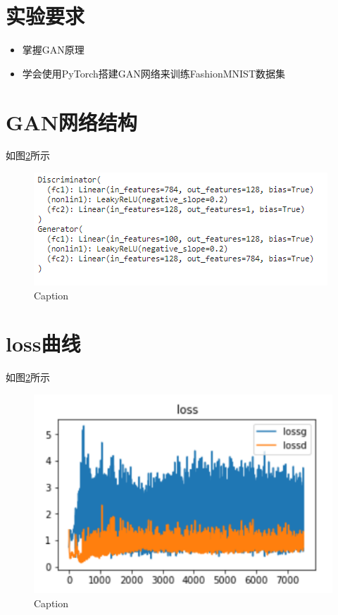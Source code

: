 \documentclass[UTF8,a4paper,10pt]{ctexart}
\begin{document}
\section{实验要求}

\begin{itemize}
    \item 掌握GAN原理
    \item 学会使用PyTorch搭建GAN网络来训练FashionMNIST数据集
\end{itemize}


\section{GAN网络结构}

如图\ref{fig:1}所示
\begin{figure}[H]
    \centering
    \includegraphics[scale=1]{1.png}
    \caption{Caption}
    \label{fig:1}
\end{figure}

\section{loss曲线}

如图\ref{fig:1}所示
\begin{figure}[H]
    \centering
    \includegraphics[scale=0.5]{2.png}
    \caption{Caption}
    \label{fig:1}
\end{figure}
\end{document}
